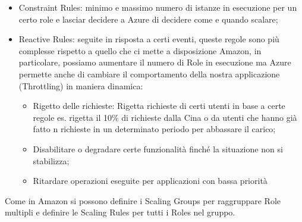 \documentclass[11pt, twocolumn]{article}
\newenvironment{myitemize}
{ \begin{itemize}[topsep=0ex]
		\setlength{\itemsep}{0pt}
		\setlength{\parskip}{0pt}
		\setlength{\parsep}{0pt}     }
	{ \end{itemize}                  }
\begin{document}
\begin{myitemize}
	\item Constraint Rules: minimo e massimo numero di istanze in esecuzione per un certo role e lasciar decidere a Azure di decidere come e quando scalare;
	\item Reactive Rules: seguite in risposta a certi eventi, queste regole sono più complesse rispetto a quello che ci mette a disposizione Amazon, in particolare, possiamo aumentare il numero di Role in esecuzione ma Azure permette anche di cambiare il comportamento della nostra applicazione (Throttling) in maniera dinamica:
	\begin{myitemize}
		\item Rigetto delle richieste: Rigetta richieste di certi utenti in base a certe regole es. rigetta il 10\% di richieste dalla Cina o da utenti che hanno già fatto n richieste in un determinato periodo per abbassare il carico;
		\item Disabilitare o degradare certe funzionalità finché la situazione non si stabilizza;
		\item Ritardare operazioni eseguite per applicazioni con bassa priorità
	\end{myitemize}
\end{myitemize}
Come in Amazon si possono definire i Scaling Groups per raggruppare Role multipli e definire le Scaling Rules per tutti i Roles nel gruppo.
\end{document}
